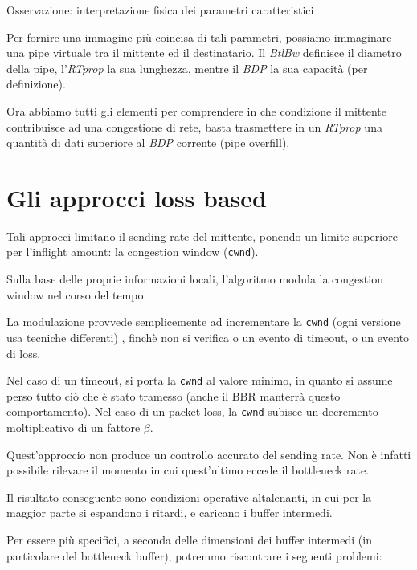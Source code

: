 \begin{suggerimento}{Osservazione: interpretazione fisica dei parametri caratteristici}

Per fornire una immagine più coincisa di tali parametri, possiamo immaginare una pipe virtuale tra il mittente ed il destinatario. Il \textit{BtlBw} definisce il diametro della pipe, l’\textit{RTprop} la sua lunghezza, mentre il \textit{BDP} la sua capacità (per definizione). \bigskip

\end{suggerimento}

Ora abbiamo tutti gli elementi per comprendere in che condizione il mittente contribuisce ad una congestione di rete, basta trasmettere in un \textit{RTprop} una quantità di dati superiore al \textit{BDP} corrente (pipe overfill). \bigskip

\section{Gli approcci loss based}

Tali approcci limitano il sending rate del mittente, ponendo un limite superiore per l'inflight amount: la congestion window (\texttt{cwnd}). \bigskip

Sulla base delle proprie informazioni locali, l'algoritmo modula la congestion window nel corso del tempo. \bigskip

La modulazione provvede semplicemente ad incrementare la \texttt{cwnd} (ogni versione usa tecniche differenti) , finchè non si verifica o un evento di timeout, o un evento di loss. \bigskip

Nel caso di un timeout, si porta la \texttt{cwnd} al valore minimo, in quanto si assume perso tutto ciò che è stato tramesso (anche il BBR manterrà questo comportamento).
Nel caso di un packet loss, la \texttt{cwnd} subisce un decremento moltiplicativo di un fattore $ \beta $. \bigskip

Quest'approccio non produce un controllo accurato del sending rate. Non è infatti possibile rilevare il momento in cui quest'ultimo eccede il bottleneck rate. \bigskip

Il risultato conseguente sono condizioni operative altalenanti, in cui per la maggior parte si espandono i ritardi, e caricano i buffer intermedi. \bigskip

Per essere più specifici, a seconda delle dimensioni dei buffer intermedi (in particolare del bottleneck buffer), potremmo riscontrare i seguenti problemi:

